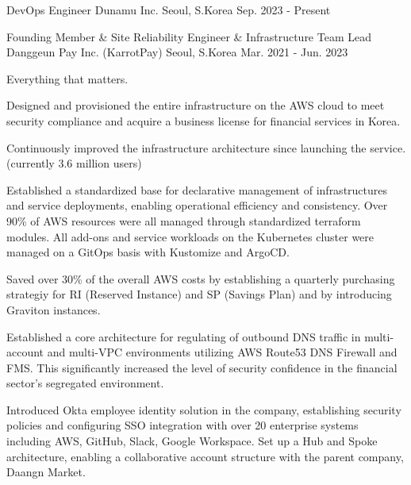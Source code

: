 
\begin{cventries}

  \cventry
  {DevOps Engineer} %
  {Dunamu Inc.} %
  {Seoul, S.Korea} %
  {Sep. 2023 - Present} %
  {
  }

  \cventry
  {Founding Member \& Site Reliability Engineer \& Infrastructure Team Lead} %
  {Danggeun Pay Inc. (KarrotPay)} %
  {Seoul, S.Korea} %
  {Mar. 2021 - Jun. 2023} %
  {
    \begin{cvitems} %
    \item {Everything that matters.}
    \item {Designed and provisioned the entire infrastructure on the AWS cloud to meet security compliance and acquire a business license for financial services in Korea.}
    \item {Continuously improved the infrastructure architecture since launching the service. (currently 3.6 million users)}
    \item {Established a standardized base for declarative management of infrastructures and service deployments, enabling operational efficiency and consistency. Over 90\% of AWS resources were all managed through standardized terraform modules. All add-ons and service workloads on the Kubernetes cluster were managed on a GitOps basis with Kustomize and ArgoCD.}
    \item {Saved over 30\% of the overall AWS costs by establishing a quarterly purchasing strategiy for RI (Reserved Instance) and SP (Savings Plan) and by introducing Graviton instances.}
    \item {Established a core architecture for regulating of outbound DNS traffic in multi-account and multi-VPC environments utilizing AWS Route53 DNS Firewall and FMS. This significantly increased the level of security confidence in the financial sector's segregated environment.}
    \item {Introduced Okta employee identity solution in the company, establishing security policies and configuring SSO integration with over 20 enterprise systems including AWS, GitHub, Slack, Google Workspace. Set up a Hub and Spoke architecture, enabling a collaborative account structure with the parent company, Daangn Market.}
    \end{cvitems}
  }

\end{cventries}
